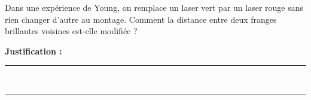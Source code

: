 Dans une expérience de Young, on remplace un laser vert par un laser rouge sans rien changer d'autre au montage. Comment la distance entre deux franges brillantes voisines est-elle modifiée ?

\choices

\noindent\textbf{Justification :} \hrulefill \\[2.5ex]
\rule{\linewidth}{0.4pt} \\[2.5ex]
\rule{\linewidth}{0.4pt}
\vfill
